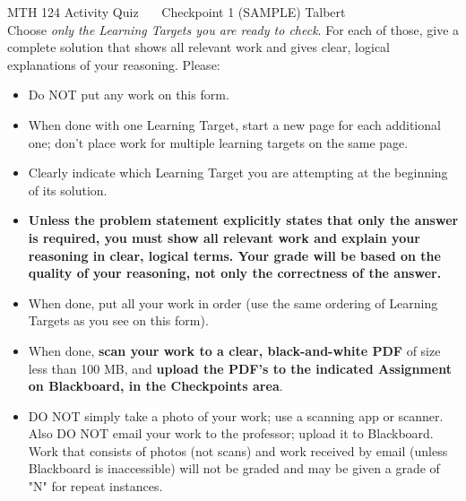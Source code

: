 \documentclass[11 pt]{article}
\begin{document}
\noindent MTH 124 Activity Quiz \ \ \ Checkpoint 1 (SAMPLE) \hfill Talbert \\

 Choose \emph{only the Learning Targets you are ready to check}. For each of those, give a complete solution that shows all relevant work and gives clear, logical explanations of your reasoning. Please: 

\begin{itemize}
    \item Do NOT put any work on this form. 
    \item When done with one Learning Target, start a new page for each additional one; don't place work for multiple learning targets on the same page. 
    \item Clearly indicate which Learning Target you are attempting at the beginning of its solution. 
    \item \textbf{Unless the problem statement explicitly states that only the answer is required, you must show all relevant work and explain your reasoning in clear, logical terms. Your grade will be based on the quality of your reasoning, not only the correctness of the answer.}
    \item When done, put all your work in order (use the same ordering of Learning Targets as you see on this form). 
    \item When done, \textbf{scan your work to a clear, black-and-white PDF} of size less than 100 MB, and \textbf{upload the PDF's to the indicated Assignment on Blackboard, in the Checkpoints area}. 
    \item DO NOT simply take a photo of your work; use a scanning app or scanner. Also DO NOT email your work to the professor; upload it to Blackboard. Work that consists of photos (not scans) and work received by email (unless Blackboard is inaccessible) will not be graded and may be given a grade of "N" for repeat instances. 
\end{itemize}

\noindent \hrulefill
\end{document}
